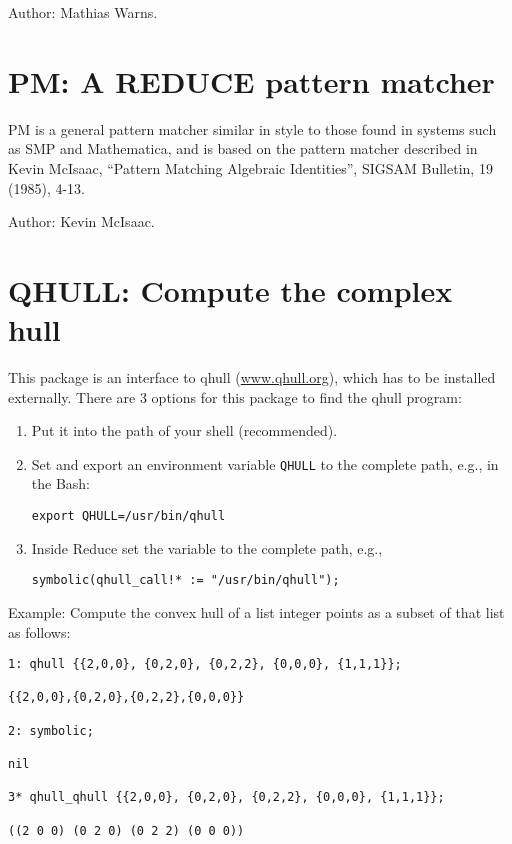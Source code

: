 Author: Mathias Warns.


\newpage

\section{PM: A REDUCE pattern matcher} 

PM is a general pattern matcher similar in style to those found in systems
such as SMP and Mathematica, and is based on the pattern matcher described
in Kevin McIsaac, ``Pattern Matching Algebraic Identities'', SIGSAM Bulletin,
19 (1985), 4-13.

Author: Kevin McIsaac.


\newpage

%
%
%
%

\section{QHULL: Compute the complex hull}


This package is an interface to qhull (\url{www.qhull.org}), which has to be installed
externally. There are 3 options for this package to find the qhull program:
\begin{enumerate}
\item Put it into the path of your shell (recommended).
\item Set and export an environment variable \texttt{QHULL} to the complete path, e.g., in
the Bash:
\begin{verbatim}
export QHULL=/usr/bin/qhull
\end{verbatim}
\item Inside Reduce set the variable  to the complete path, e.g.,
\begin{verbatim}
symbolic(qhull_call!* := "/usr/bin/qhull");
\end{verbatim}
\end{enumerate}
Example: 
Compute the convex hull of a list integer points as a subset
of that list as follows:
\begin{verbatim}
1: qhull {{2,0,0}, {0,2,0}, {0,2,2}, {0,0,0}, {1,1,1}};

{{2,0,0},{0,2,0},{0,2,2},{0,0,0}}

2: symbolic;

nil

3* qhull_qhull {{2,0,0}, {0,2,0}, {0,2,2}, {0,0,0}, {1,1,1}};

((2 0 0) (0 2 0) (0 2 2) (0 0 0))
\end{verbatim}

